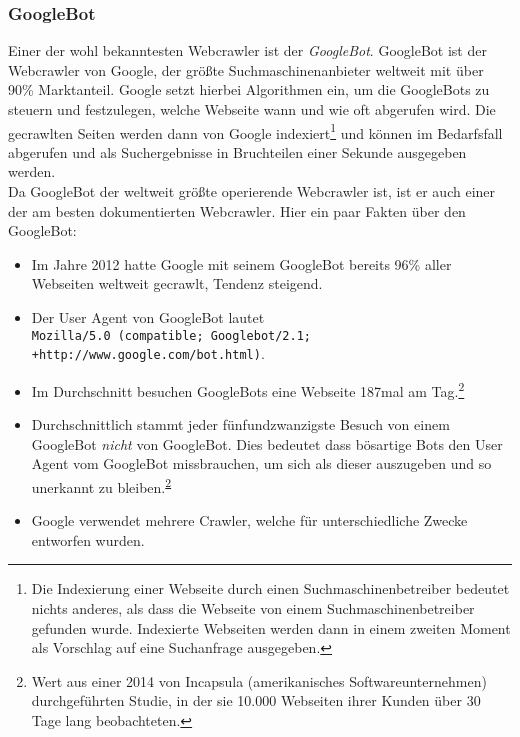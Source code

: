 \subsubsection{GoogleBot}
Einer der wohl bekanntesten Webcrawler ist der \emph{GoogleBot}. GoogleBot ist der Webcrawler von Google, der größte Suchmaschinenanbieter weltweit mit über 90\% Marktanteil\cite{google-marktanteil}. Google setzt hierbei Algorithmen ein, um die GoogleBots zu steuern und festzulegen, welche Webseite wann und wie oft abgerufen wird\cite{googlebot-googleconsole}. Die gecrawlten Seiten werden dann von Google indexiert\footnote{Die Indexierung einer Webseite durch einen Suchmaschinenbetreiber bedeutet nichts anderes, als dass die Webseite von einem Suchmaschinenbetreiber gefunden wurde. Indexierte Webseiten werden dann in einem zweiten Moment als Vorschlag auf eine Suchanfrage ausgegeben.\cite{was-ist-indexieren}} und können im Bedarfsfall abgerufen und als Suchergebnisse in Bruchteilen einer Sekunde ausgegeben werden.\\
Da GoogleBot der weltweit größte operierende Webcrawler ist, ist er auch einer der am besten dokumentierten Webcrawler. Hier ein paar Fakten über den GoogleBot:
\begin{itemize}
	\item Im Jahre 2012 hatte Google mit seinem GoogleBot bereits 96\%\cite{googlebot-facts-percentage} aller Webseiten weltweit gecrawlt, Tendenz steigend. 
	\item Der User Agent von GoogleBot lautet\\\texttt{Mozilla/5.0 (compatible; Googlebot/2.1;\\+http://www.google.com/bot.html)}\cite{googlebot-user-agent}. 
	\item Im Durchschnitt besuchen GoogleBots eine Webseite 187mal am Tag\cite{googlebot-facts-incapsula}.\footnote{\label{footnote:incapsula-studie}Wert aus einer 2014 von Incapsula (amerikanisches Softwareunternehmen) durchgeführten Studie, in der sie 10.000 Webseiten ihrer Kunden über 30 Tage lang beobachteten.}
	\item Durchschnittlich stammt jeder fünfundzwanzigste Besuch von einem GoogleBot \emph{nicht} von GoogleBot. Dies bedeutet dass bösartige Bots den User Agent vom GoogleBot missbrauchen, um sich als dieser auszugeben und so unerkannt zu bleiben.\cite{googlebot-facts-incapsula}\textsuperscript{\ref{footnote:incapsula-studie}}
	\item Google verwendet mehrere Crawler, welche für unterschiedliche Zwecke entworfen wurden\cite{googlebot-user-agent}.
\end{itemize}
\label{subsub:googlebot}

